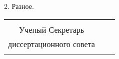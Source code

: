 2.	Разное.

\begin{center}
	\begin{tabular}[c]{c m{4cm} l}
		&            &                     \\
		Ученый Секретарь     &            &                     \\
		диссертационного совета & \hrulefill & \dcSecretaryFullFIO \\
		\dcSecretaryRegalia   &            &
	\end{tabular}
\end{center}

\clearpage

